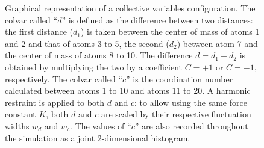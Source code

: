 \begin{figure}[!ht]
  \centering
{}
  \caption[Graphical representation of a collective variables configuration.]{Graphical representation of a collective variables configuration.
    The colvar called ``$d$'' is defined as the difference between two distances: the first distance ($d_{1}$) is taken between the center of mass of atoms 1 and 2 and that of atoms 3 to 5, the second ($d_{2}$) between atom 7 and the center of mass of atoms 8 to 10.
The difference $d = d_{1} - d_{2}$ is obtained by multiplying the two by a coefficient $C = +1$ or $C = -1$, respectively.
The colvar called ``$c$'' is the coordination number calculated between atoms 1 to 10 and atoms 11 to 20.  A harmonic restraint is applied to both $d$ and $c$: to allow using the same force constant $K$, both $d$ and $c$ are scaled by their respective fluctuation widths $w_d$ and $w_c$.
The values of ``$c$'' are also recorded throughout the simulation as a joint 2-dimensional histogram.
}
  \label{fig:colvars_diagram}
\end{figure}

